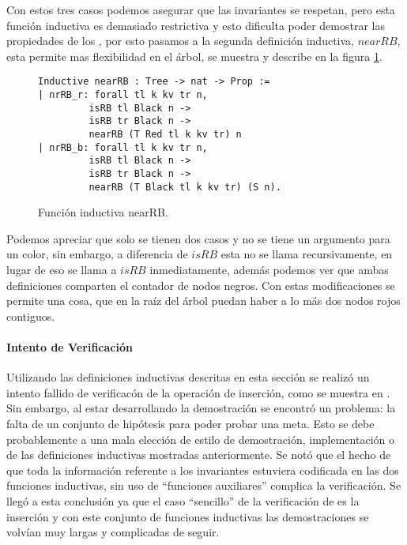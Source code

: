 Con estos tres casos podemos asegurar que las invariantes se respetan, pero esta funci\'on
inductiva es demasiado restrictiva y esto dificulta poder demostrar las propiedades de los {\arns},
por esto pasamos a la segunda definici\'on inductiva, \hyperref[inductive_nearRB]{$nearRB$}, esta 
permite mas flexibilidad en el \'arbol, se muestra y describe en la figura \ref{inductive_nearRB}.
\begin{figure}[!ht]
\centering
\captionsetup{justification=centering}
\begin{verbatim}
Inductive nearRB : Tree -> nat -> Prop :=
| nrRB_r: forall tl k kv tr n,
         isRB tl Black n ->
         isRB tr Black n ->
         nearRB (T Red tl k kv tr) n
| nrRB_b: forall tl k kv tr n,
         isRB tl Black n ->
         isRB tr Black n ->
         nearRB (T Black tl k kv tr) (S n).
\end{verbatim}
\caption{Funci\'on inductiva nearRB.}
\label{inductive_nearRB}
\end{figure}

Podemos apreciar que solo se tienen dos casos y no se tiene un argumento para un color, sin
embargo, a diferencia de \hyperref[inductive_isRB]{$isRB$} esta no se llama recursivamente, en lugar
de eso se llama a \hyperref[inductive_isRB]{$isRB$} inmediatamente, además podemos ver que ambas 
definiciones comparten el contador de nodos negros. Con estas modificaciones se permite una cosa, 
que en la ra\'iz del \'arbol puedan haber a lo m\'as dos nodos rojos contiguos.

\paragraph{Intento de Verificaci\'on}
Utilizando las definiciones inductivas descritas en esta secci\'on se realiz\'o un intento fallido 
de verificac\'on de la operaci\'on de inserci\'on, como se muestra en \cite{appel}. Sin embargo, al
estar desarrollando la demostraci\'on se encontró un problema: la falta de un conjunto de
hipótesis para poder probar una meta. Esto se debe probablemente a una mala elección de estilo de
demostraci\'on, implementaci\'on o de las definiciones inductivas mostradas anteriormente. Se not\'o
que el hecho de que toda la informaci\'on referente a los invariantes estuviera codificada en las
dos funciones inductivas, sin uso de ``funciones auxiliares'' complica la verificaci\'on. Se
lleg\'o a esta conclusi\'on ya que el caso ``sencillo'' de la verificaci\'on de {\arns} es la 
inserci\'on y con este conjunto de funciones inductivas las demostraciones se volvían muy largas y
complicadas de seguir.

